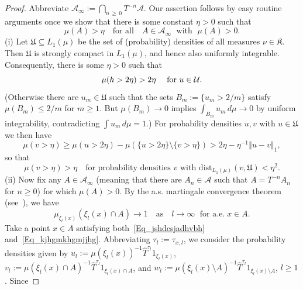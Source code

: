 \documentclass[AHL,Unicode,longabstracts]{cedram}
\newcommand{\clA}{\mathcal{A}}
\newcommand{\clU}{\mathcal{U}}
\newcommand{\dist}{\mathrm{dist}}
\newcommand{\frkK}{\mathfrak{K}}
\newcommand{\frkU}{\mathfrak{U}}
\begin{document}
\begin{proof}
Abbreviate $\clA_{\infty}:=\bigcap_{n\,\geq\,0}T^{-n}\clA$. Our assertion follows by easy routine arguments once we show that there is some constant $\eta>0$ such that
\begin{equation}\label{Eq_ConstEtaForTail}
\mu(A)>\eta \quad \text{for all}\quad A\in\clA_{\infty}\;\text{ with }\;
\mu(A)>0. 
\end{equation}
\vspace{6pt}
\noindent(i) Let $\frkU\subseteq L_{1}(\mu)$ be the set of (probability) densities of all measures $\nu\in\frkK$. Then $\frkU$ is strongly compact in $L_{1}(\mu)$, and hence also uniformly integrable. Consequently, there is some $\eta>0$ such that
\begin{equation}\label{Eq_scvcadsxdasxdaxdasxd}
\mu(h>2\eta)>2\eta\text{ \quad for }u\in\clU\text{.}
\end{equation}
(Otherwise there are $u_{m}\in\frkU$ such that the sets $B_{m} :=\{u_{m}>2/m\}$ satisfy $\mu(B_{m})\leq2/m$ for $m\geq1$. But $\mu (B_{m})\rightarrow0$ implies $\int_{B_{m}}u_{m}\,d\mu\rightarrow0$ by uniform integrability, contradicting $\int u_{m}\,d\mu=1$.) For probability densities $u,v$ with $u\in\frkU$ we then have
\[
\mu(v>\eta)\geq\mu(u>2\eta)-\mu\left(\{u>2\eta\}\setminus\{v>\eta\}\right)>2\eta -\eta^{-1}\left\Vert u-v\right\Vert _{1},
\]
so that
\begin{equation}\label{Eq_hvbfdhvbjdfvbjshbvbv}
\mu(v>\eta)>\eta \quad \text{for probability densities }v\text{ with }\dist_{L_{1}(\mu)}(v,\frkU)<\eta^{2}. 
\end{equation}
\vspace{6pt}
\noindent(ii) Now fix any $A\in\clA_{\infty}$ (meaning that there are $A_{n}\in\clA$ such that $A=T^{-n}A_{n}$ for $n\geq0$) for which $\mu(A)>0$. By the a.s. martingale convergence theorem (see~\cite[Theorem~35.5 and Exercise~35.17]{BilliPM}), we have
\begin{equation}\label{Eq_kjhgmkhgmjjhg}
\mu_{\xi_{l}(x)}\left(\xi_{l}(x)\cap A\right)\longrightarrow1\quad \text{as}\quad l\rightarrow\infty\;\text{ for a.e.}\;x\in A. 
\end{equation}
Take a point $x\in A$ satisfying both~\eqref{Eq_jshdcsjadhvbh} and~\eqref{Eq_kjhgmkhgmjjhg}. Abbreviating $\tau_{l}:=\tau_{x,l}$, we consider the probability densities given by $u_{l}:=\mu(\xi_{l}(x))^{-1}\widehat{T} ^{\tau_{l}}1_{\xi_{l}(x)}$, $v_{l}:=\mu(\xi_{l}(x)\cap A)^{-1}\widehat {T}^{\tau_{l}}1_{\xi_{l}(x)\cap A}$, and $w_{l}:=\mu(\xi_{l}(x)\setminus A)^{-1}\widehat{T}^{\tau_{l}}1_{\xi_{l}(x)\setminus A}$, $l\geq1$. Since

\end{proof}
\end{document}
